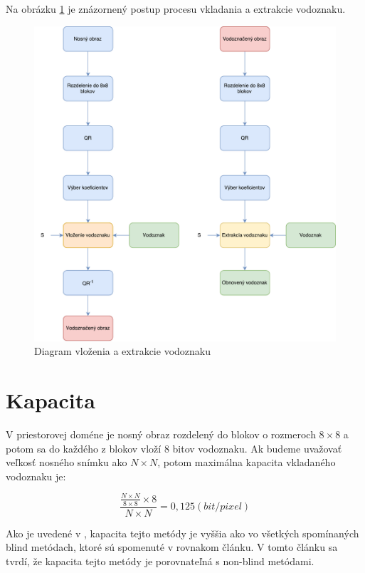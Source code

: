 Na obrázku \ref{fig:embed-extract} je znázornený postup procesu vkladania a extrakcie vodoznaku.

\begin{figure}
    \centering
    \includegraphics[scale=0.59]{obrazky/embed-extract}
    \caption{Diagram vloženia a extrakcie vodoznaku}
    \label{fig:embed-extract}
\end{figure}

\clearpage
\section{Kapacita}
V priestorovej doméne je nosný obraz rozdelený do blokov o rozmeroch $8\times8$ a potom sa do každého z blokov vloží 8 bitov vodoznaku. Ak budeme uvažovať veľkosť nosného snímku ako $N\times N$, potom maximálna kapacita vkladaného vodoznaku je:

\begin{equation}
\frac{\frac{N\times N}{8\times 8}\times 8}{N \times N} =  0,125(bit/pixel)
\end{equation}

Ako je uvedené v \cite{QRdecomposition}, kapacita tejto metódy je vyššia ako vo všetkých spomínaných blind metódach, ktoré sú spomenuté v rovnakom článku. V tomto článku sa tvrdí, že kapacita tejto metódy je porovnateľná s non-blind metódami.

